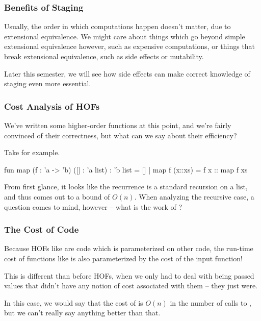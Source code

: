 \documentclass[aspectratio=169, handout]{beamer}
\begin{document}
\begin{frame}[fragile]
  \frametitle{Benefits of Staging}

  Usually, the order in which computations happen doesn't matter, due to extensional
  equivalence. We might care about things which go beyond simple extensional equivalence
  however, such as expensive computations, or things that break extensional equivalence,
  such as side effects or mutability.

  \pause
  \vspace{\fill}

  Later this semester, we will see how side effects can make correct knowledge of staging
  even more essential.
\end{frame}


\begin{frame}[fragile]
  \frametitle{Cost Analysis of HOFs}

  We've written some higher-order functions at this point, and we're fairly convinced
  of their correctness, but what can we say about their efficiency?

  \pause
  \vspace{\fill}

  Take  for example.

  \pause
  \vspace{\fill}

  \begin{codeblock}
    fun map (f : 'a -> 'b) ([] : 'a list) : 'b list = []
      | map f (x::xs) = f x :: map f xs
  \end{codeblock}

  \pause
  \vspace{\fill}

  From first glance, it looks like the recurrence is a standard recursion on a list,
  and thus comes out to a bound of $O(n)$. When analyzing the recursive case, a question
  comes to mind, however -- what is the work of ?
\end{frame}

\begin{frame}[fragile]
  \frametitle{The Cost of Code}

  \ptmt

  Because HOFs like  are code which is parameterized on other code,
  the run-time cost of functions like  is also parameterized by
  the cost of the input function!

  \pause
  \vspace{\fill}

  This is different than before HOFs, when we only had to deal with being passed
  values that didn't have any notion of cost associated with them -- they just were.

  \pause
  \vspace{\fill}

  In this case, we would say that the cost of  is $O(n)$ in the number of
  calls to , but we can't really say anything better than that.
\end{frame}
\end{document}
